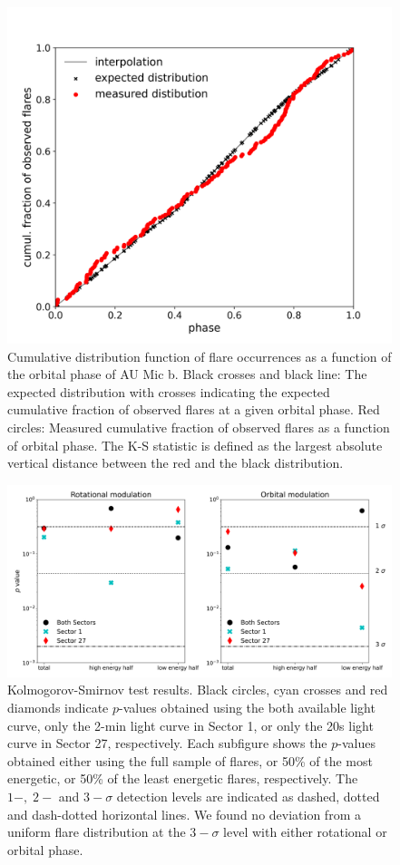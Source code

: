 \documentclass[fleqn,usenatbib,letters]{mnras}%
\begin{document}
\begin{figure}
\includegraphics[width=\hsize]{figures/2021_06_08_AUMic_KS_Test_cumdist_total_Both_Sectors_Orbit.png} 
\caption{Cumulative distribution function of flare occurrences as a function of the orbital phase of AU Mic b. Black crosses and black line: The expected distribution with crosses indicating the expected cumulative fraction of observed flares at a given orbital phase. Red circles: Measured cumulative fraction of observed flares as a function of orbital phase. The K-S statistic is defined as the largest absolute vertical distance between the red and the black distribution.}
\label{fig:cumdist}
\end{figure}

\begin{figure}
\includegraphics[width=\hsize]{figures/2021_06_09_AUMic_KStests_meta.png} 
\caption{Kolmogorov-Smirnov test results. Black circles, cyan crosses and red diamonds indicate $p$-values obtained using the both available light curve, only the 2-min light curve in Sector 1, or only the 20s light curve in Sector 27, respectively. Each subfigure shows the $p$-values obtained either using the full sample of flares, or 50\% of the most energetic, or 50\% of the least energetic flares, respectively. The $1-,\;2-$ and $3-\sigma$ detection levels are indicated as dashed, dotted and dash-dotted horizontal lines. We found no deviation from a uniform flare distribution at the $3-\sigma$ level with either rotational or orbital phase.}
\label{fig:kstests}
\end{figure}
\end{document}
